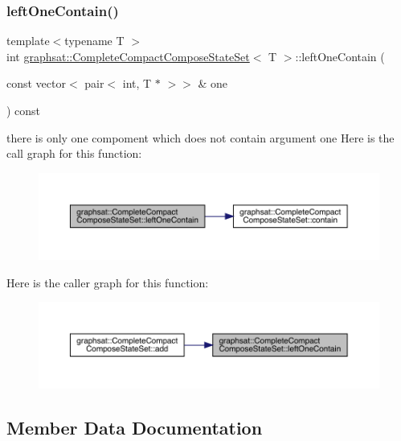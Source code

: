 \subsubsection{\texorpdfstring{leftOneContain()}{leftOneContain()}}
{\footnotesize\ttfamily template$<$typename T $>$ \\
int \mbox{\hyperlink{classgraphsat_1_1_complete_compact_compose_state_set}{graphsat\+::\+Complete\+Compact\+Compose\+State\+Set}}$<$ T $>$\+::left\+One\+Contain (\begin{DoxyParamCaption}\item[{const vector$<$ pair$<$ int, T $\ast$ $>$$>$ \&}]{one }\end{DoxyParamCaption}) const\hspace{0.3cm}{\ttfamily [inline]}}

there is only one compoment which does not contain argument one Here is the call graph for this function\+:\nopagebreak
\begin{figure}[H]
\begin{center}
\leavevmode
\includegraphics[width=350pt]{classgraphsat_1_1_complete_compact_compose_state_set_a6e731c47f2ab2415306aab198c7c4151_cgraph}
\end{center}
\end{figure}
Here is the caller graph for this function\+:\nopagebreak
\begin{figure}[H]
\begin{center}
\leavevmode
\includegraphics[width=350pt]{classgraphsat_1_1_complete_compact_compose_state_set_a6e731c47f2ab2415306aab198c7c4151_icgraph}
\end{center}
\end{figure}


\subsection{Member Data Documentation}
\mbox{\label{classgraphsat_1_1_complete_compact_compose_state_set_ad9f28cc7d42cc49dd6bb3c90c9b6b65d}} 
